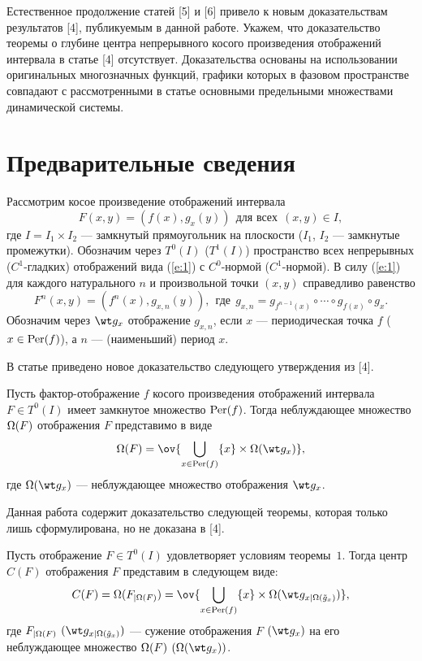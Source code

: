 Естественное продолжение статей [5] и [6] привело к
новым доказательствам результатов [4],
публикуемым в данной работе.
Укажем, что доказательство теоремы о глубине центра непрерывного
косого произведения отображений интервала в статье [4]
отсутствует. Доказательства основаны на использовании
оригинальных многозначных функций, графики которых в
фазовом пространстве совпадают с
рассмотренными в статье основными предельными множествами
динамической системы.


\section{Предварительные сведения}

Рассмотрим косое произведение отображений интервала
\begin{equation}\label{e:1}
F(x, y)=(f(x), g_x(y)) \ \ \text{для всех} \ \ (x, y)\in I,
\end{equation}
где $I=I_1\times I_2$ --- замкнутый прямоугольник на плоскости
($I_1$, $I_2$ --- замкнутые промежутки).
Обозначим через $T^0(I)$ ($T^1(I)$) пространство всех непрерывных
($C^1$-гладких)
отображений вида (\ref{e:1}) с $C^0$-нормой ($C^1$-нормой).
В силу (\ref{e:1}) для каждого
натурального $n$ и произвольной точки $(x, y)$
справедливо равенство
\begin{equation}\label{e:2}
F^n(x, y)=(f^n(x), g_{x, n}(y)), \ \ \text{где} 
\ \ g_{x, n}=g_{f^{n-1}(x)}\circ\dotsb\circ g_{f(x)}\circ g_x.
\end{equation}
Обозначим через $\wt g_x$ отображение $g_{x, n}$, если
$x$ --- периодическая точка $f$ ($x\in \operatorname{Per}(f)$), а
$n$ --- (наименьший) период $x$.

В статье приведено новое доказательство
следующего утверждения из [4].


\begin{thm}
Пусть фактор-отображение $f$
косого произведения отображений интервала $F\in T^0(I)$
имеет замкнутое множество $\operatorname{Per}(f)$.
Тогда неблуждающее множество $\Omega(F)$ отображения $F$
представимо в виде
$$
\Om(F)=\ov{\bigcup\limits_{x\in \Per(f)}
\{x\}\times\Om(\wt g_x)},
$$
где $\Om(\wt g_x)$ --- неблуждающее множество отображения $\wt g_x$.
\end{thm}

Данная работа содержит доказательство следующей теоремы,
которая только лишь
сформулирована, но не доказана в [4].


\begin{thm}
Пусть отображение $F\in T^0(I)$
удовлетворяет условиям теоремы~$1$.
Тогда центр $C(F)$ отображения $F$
представим в следующем виде\/${:}$
$$
C(F)=\Om(F_{|\Om(F)})=\ov{\bigcup\limits_{x\in \Per(f)}
\{x\}\times\Om(\wt g_{x|\Om(\Tilde g_x)})},
$$
где $F_{|\Omega(F)}$ $(\wt g_{x|\Om(\Tilde g_x)})$ --- сужение
отображения $F$ $(\wt g_x)$ на его неблуждающее множество
$\Omega(F)$ $(\Om(\wt g_x))$.
\end{thm}


